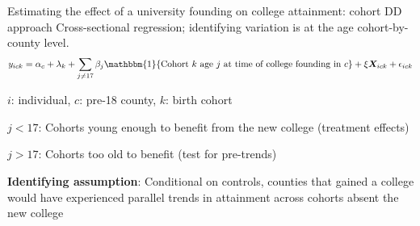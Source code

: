 \documentclass[notes,11pt, aspectratio=169]{beamer}
\newenvironment{wideitemize}{\itemize\addtolength{\itemsep}{10pt}}{\enditemize}
\begin{document}
\begin{frame}{Estimating the effect of a university founding on college attainment: cohort DD approach}
  Cross-sectional regression; identifying variation is at the age cohort-by-county level.
  \begin{equation}
    y_{ick} = \alpha_c + \lambda_k + \sum_{j \neq 17} \beta_j \mathbbm{1}\{\text{Cohort } k \text{ age } j \text{ at time of college founding in } c\} + \xi \bm{X}_{ick} + \epsilon_{ick}
  \end{equation}
  \begin{wideitemize}
    \item $i$: individual, $c$: pre-18 county, $k$: birth cohort
    \item $j < 17$: Cohorts young enough to benefit from the new college (treatment effects)
    \item $j > 17$: Cohorts too old to benefit (test for pre-trends)
    \item \textbf{Identifying assumption}: Conditional on controls, counties that gained a college would have experienced parallel trends in attainment across cohorts absent the new college
  \end{wideitemize}
\end{frame}
\end{document}
